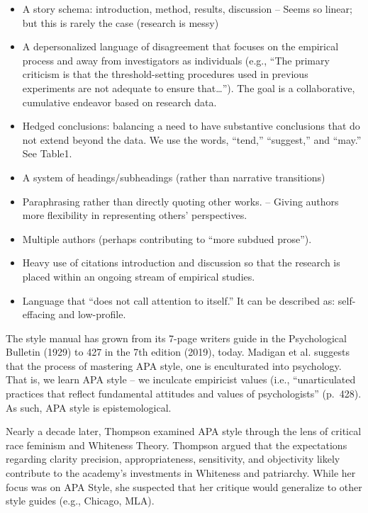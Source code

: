 \documentclass[
  english,
]{book}
\providecommand{\tightlist}{%
  \setlength{\itemsep}{0pt}\setlength{\parskip}{0pt}}
\begin{document}
\begin{itemize}
\tightlist
\item
  A story schema: introduction, method, results, discussion
  -- Seems so linear; but this is rarely the case (research is messy)
\item
  A depersonalized language of disagreement that focuses on the empirical process and away from investigators as individuals (e.g., ``The primary criticism is that the threshold-setting procedures used in previous experiments are not adequate to ensure that\ldots{}''). The goal is a collaborative, cumulative endeavor based on research data.
\item
  Hedged conclusions: balancing a need to have substantive conclusions that do not extend beyond the data. We use the words, ``tend,'' ``suggest,'' and ``may.'' See Table1.
\item
  A system of headings/subheadings (rather than narrative transitions)
\item
  Paraphrasing rather than directly quoting other works.
  -- Giving authors more flexibility in representing others' perspectives.
\item
  Multiple authors (perhaps contributing to ``more subdued prose'').
\item
  Heavy use of citations introduction and discussion so that the research is placed within an ongoing stream of empirical studies.
\item
  Language that ``does not call attention to itself.'' It can be described as: self-effacing and low-profile.
\end{itemize}

The style manual has grown from its 7-page writers guide in the Psychological Bulletin (1929) to 427 in the 7th edition (2019), today. Madigan et al. \citeyearpar{madigan_language_1995} suggests that the process of mastering APA style, one is enculturated into psychology. That is, we learn APA style -- we inculcate empiricist values (i.e., ``unarticulated practices that reflect fundamental attitudes and values of psychologists'' (p.~428). As such, APA style is epistemological.

Nearly a decade later, Thompson \citeyearpar{thompson_gentlemanly_2004} examined APA style through the lens of critical race feminism and Whiteness Theory. Thompson argued that the expectations regarding clarity precision, appropriateness, sensitivity, and objectivity likely contribute to the academy's investments in Whiteness and patriarchy. While her focus was on APA Style, she suspected that her critique would generalize to other style guides (e.g., Chicago, MLA).
\end{document}
